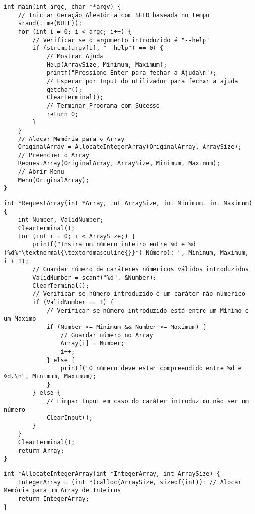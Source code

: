 \begin{lstlisting}[caption=Verificação dos argumentos e preenchimento do Vetor., label=chap4:code:2]
int main(int argc, char **argv) {
    // Iniciar Geração Aleatória com SEED baseada no tempo
    srand(time(NULL));
    for (int i = 0; i < argc; i++) {
        // Verificar se o argumento introduzido é "--help"
        if (strcmp(argv[i], "--help") == 0) {
            // Mostrar Ajuda
            Help(ArraySize, Minimum, Maximum);
            printf("Pressione Enter para fechar a Ajuda\n");
            // Esperar por Input do utilizador para fechar a ajuda
            getchar();
            ClearTerminal();
            // Terminar Programa com Sucesso
            return 0;
        }
    }
    // Alocar Memória para o Array
    OriginalArray = AllocateIntegerArray(OriginalArray, ArraySize);
    // Preencher o Array
    RequestArray(OriginalArray, ArraySize, Minimum, Maximum);
    // Abrir Menu
    Menu(OriginalArray);
}    
\end{lstlisting}

\newpage

\begin{lstlisting}[caption={Pedir, Verificar e Guardar Números Introduzidos.}, label=chap4:code:3]
int *RequestArray(int *Array, int ArraySize, int Minimum, int Maximum) {
    int Number, ValidNumber;
    ClearTerminal();
    for (int i = 0; i < ArraySize;) {
        printf("Insira um número inteiro entre %d e %d (%d%*\textnormal{\textordmasculine{}}*) Número): ", Minimum, Maximum, i + 1);
        // Guardar número de caráteres númericos válidos introduzidos
        ValidNumber = scanf("%d", &Number);
        ClearTerminal();
        // Verificar se número introduzido é um caráter não númerico
        if (ValidNumber == 1) {
            // Verificar se número introduzido está entre um Mínimo e um Máximo
            if (Number >= Minimum && Number <= Maximum) {
                // Guardar número no Array
                Array[i] = Number;
                i++;
            } else {
                printf("O número deve estar compreendido entre %d e %d.\n", Minimum, Maximum);
            }
        } else {
            // Limpar Input em caso do caráter introduzido não ser um número
            ClearInput();
        }
    }
    ClearTerminal();
    return Array;
}
\end{lstlisting}

\begin{lstlisting}[caption=Alocar Memória para um Vetor de Inteiros., label=chap4:code:4]
int *AllocateIntegerArray(int *IntegerArray, int ArraySize) {
    IntegerArray = (int *)calloc(ArraySize, sizeof(int)); // Alocar Memória para um Array de Inteiros
    return IntegerArray;
}
\end{lstlisting}

